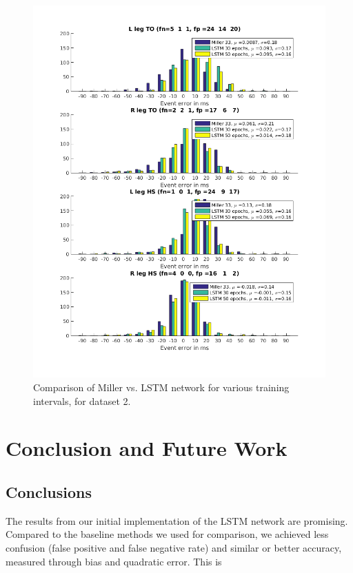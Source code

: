 \documentclass{acm_proc_article-sp}
\begin{document}
\begin{figure}[H]
 \centering
 \includegraphics[scale=.4]{./figures/Test2_2Train2_1Compare.png}
 \caption{Comparison of Miller vs. LSTM network for various training intervals, for dataset 2.}
 \label{fig:halfAndHalfUsers}
\end{figure}

\section{Conclusion and Future Work}
\label{sec:Conclusion and Future Work}
\subsection{Conclusions}
The results from our initial implementation of the LSTM network are promising. Compared to the baseline methods we used for comparison, we achieved less confusion (false positive and false negative rate) and similar or better accuracy, measured through bias and quadratic error. This is
\end{document}
